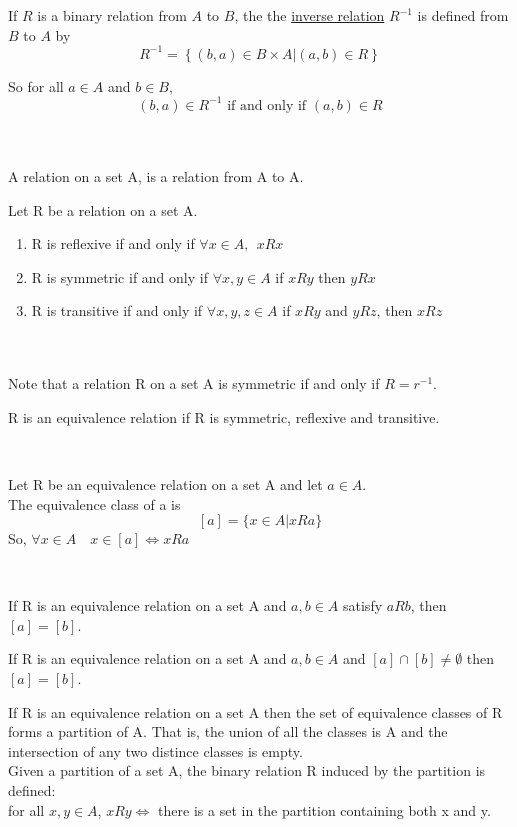 \begin{definition}
    If $R$ is a binary relation from $A$ to $B$, the the \underline{inverse relation} $R^{-1}$ is defined from $B$ to $A$ by $$R^{-1} = \left\{(b,a)\in B\times A | (a,b)\in R\right\}$$

    So for all $a\in A$ and $b\in B$, $$(b,a)\in R^{-1} \text{ if and only if }(a,b)\in R$$
\end{definition}\\\\
A relation on a set A, is a relation from A to A.\\
\begin{definition}
    Let R be a relation on a set A.\\
    \begin{enumerate}
        \item R is reflexive if and only if \(\forall x \in A, ~~xRx\)
        \item R is symmetric if and only if \(\forall x,y \in A\) if \(xRy\) then \(yRx\)
        \item R is transitive if and only if \(\forall x,y,z \in A\) if \(xRy\) and \(yRz\), then \(xRz\)
    \end{enumerate}
\end{definition}\\\\
Note that a relation R on a set A is symmetric if and only if \(R = r^{-1}\).\\
\begin{definition}
    R is an equivalence relation if R is symmetric, reflexive and transitive.
\end{definition}\\
\begin{definition}
    Let R be an equivalence relation on a set A and let \(a \in A\).\\
    The equivalence class of a is \[[a] = \{x\in A | xRa\}\]
    So, \(\forall x\in A\quad x\in [a] \iff xRa\)
\end{definition}\\
\begin{theorm}
    If R is an equivalence relation on a set A and \(a, b \in A\) satisfy \(aRb\), then \([a] = [b]\).
\end{theorm}
\begin{theorm}
    If R is an equivalence relation on a set A and \(a, b \in A\) and \([a] \cap [b] \neq \emptyset\) then \([a] = [b]\).
\end{theorm}
\begin{theorm}
    If R is an equivalence relation on a set A then the set of equivalence classes of R forms a partition of A. That is, the union of all the classes is A and the intersection of any two distince classes is empty.\\
    Given a partition of a set A, the binary relation R induced by the partition is defined:\\
    for all \(x, y \in A\), \(xRy \iff\) there is a set in the partition containing both x and y.
\end{theorm}
